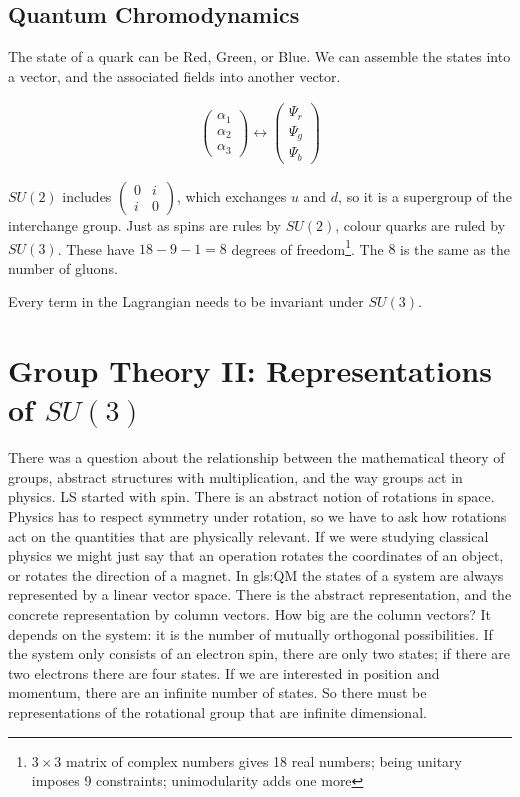 \documentclass[]{article}
\begin{document}
\subsection{Quantum Chromodynamics}

The state of a quark can be Red, Green, or Blue. We can assemble the states into a vector, and the associated fields into another vector.

\begin{align*}
	\begin{pmatrix}
		\alpha_1\\
		\alpha_2\\
		\alpha_3
	\end{pmatrix} \leftrightarrow	\begin{pmatrix}
	\Psi_r\\
	\Psi_g\\
	\Psi_b
	\end{pmatrix}
\end{align*}

 $SU(2)$ includes $\begin{pmatrix}
	0&i\\
	i&0
\end{pmatrix}$, which exchanges $u$ and $d$, so it is a supergroup of the interchange group. Just as spins are rules by $SU(2)$, colour quarks are ruled by $SU(3)$. These have $18-9-1=8$ degrees of freedom\footnote{$3\times 3$ matrix of complex numbers gives 18 real numbers; being unitary imposes 9 constraints; unimodularity adds one more}. The $8$ is the same as the number of gluons.

 Every term in the Lagrangian needs to be invariant under $SU(3)$.   
 
\section{Group Theory II: Representations of $SU(3)$}

There was a question about the relationship between the mathematical theory of groups, abstract structures with multiplication, and the way groups act in physics. LS started with spin. There is an abstract notion of rotations in space. Physics has to respect symmetry under rotation, so we have to ask how rotations act on the quantities that are physically relevant. If we were studying classical physics we might just say that an operation rotates the coordinates of an object, or rotates the direction of a magnet. In \gls{gls:QM} the states of a system are always represented by a linear vector space. There is the abstract representation, and the concrete representation by column vectors. How big are the column vectors? It depends on the system: it is the number of mutually orthogonal possibilities. If the system only consists of an electron spin, there are only two states; if there are two electrons there are four states. If we are interested in position and momentum, there are an infinite number of states. So there must be representations of the rotational group that are infinite dimensional.
\end{document}
